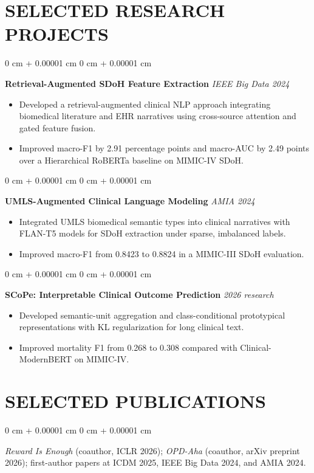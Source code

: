 \documentclass[10pt, letterpaper]{article}
\newenvironment{highlights}{
    \begin{itemize}[
        topsep=0.03 cm,
        parsep=0.02 cm,
        partopsep=0pt,
        itemsep=0pt,
        leftmargin=0 cm + 10pt
    ]
}{
    \end{itemize}
} %
\newenvironment{onecolentry}{
    \begin{adjustwidth}{
        0 cm + 0.00001 cm
    }{
        0 cm + 0.00001 cm
    }
}{
    \end{adjustwidth}
} %
\begin{document}
\section{SELECTED RESEARCH PROJECTS}
\begin{onecolentry}
\textbf{Retrieval-Augmented SDoH Feature Extraction} \hfill \textit{IEEE Big Data 2024}
\begin{highlights}
\item Developed a retrieval-augmented clinical NLP approach integrating biomedical literature and EHR narratives using cross-source attention and gated feature fusion.
\item Improved macro-F1 by 2.91 percentage points and macro-AUC by 2.49 points over a Hierarchical RoBERTa baseline on MIMIC-IV SDoH.
\end{highlights}
\end{onecolentry}
\vspace{0.02 cm}
\begin{onecolentry}
\textbf{UMLS-Augmented Clinical Language Modeling} \hfill \textit{AMIA 2024}
\begin{highlights}
\item Integrated UMLS biomedical semantic types into clinical narratives with FLAN-T5 models for SDoH extraction under sparse, imbalanced labels.
\item Improved macro-F1 from 0.8423 to 0.8824 in a MIMIC-III SDoH evaluation.
\end{highlights}
\end{onecolentry}
\vspace{0.02 cm}
\begin{onecolentry}
\textbf{SCoPe: Interpretable Clinical Outcome Prediction} \hfill \textit{2026 research}
\begin{highlights}
\item Developed semantic-unit aggregation and class-conditional prototypical representations with KL regularization for long clinical text.
\item Improved mortality F1 from 0.268 to 0.308 compared with Clinical-ModernBERT on MIMIC-IV.
\end{highlights}
\end{onecolentry}
\vspace{0.02 cm}
\section{SELECTED PUBLICATIONS}
\begin{onecolentry}
\textit{Reward Is Enough} (coauthor, ICLR 2026); \textit{OPD-Aha} (coauthor, arXiv preprint 2026); first-author papers at ICDM 2025, IEEE Big Data 2024, and AMIA 2024.
\end{onecolentry}
\end{document}
